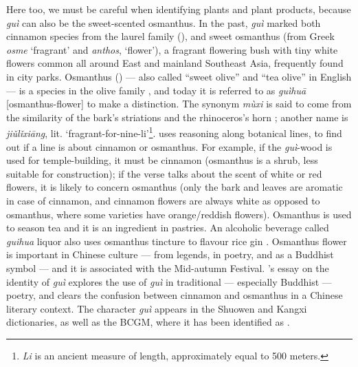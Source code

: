 Here too, we must be careful when identifying plants and plant products, because \textit{guì} can also be the sweet-scented osmanthus. In the past, \textit{guì} marked both cinnamon species from the laurel family (), and sweet osmanthus (from Greek \textit{osme} `fragrant' and \textit{anthos}, `flower'), a fragrant flowering bush with tiny white flowers common all around East and mainland Southeast Asia, frequently found in city parks. Osmanthus () --- also called ``sweet olive'' and ``tea olive'' in English --- is a species in the olive family  \parencite[191]{pearlstine_scent_2022}, and today it is referred to as  \textit{guìhuā} [osmanthus-flower] to make a distinction. The synonym  \textit{mùxi} is said to come from the similarity of the bark's striations and the rhinoceros's horn \parencite{chennault_reclusive_2006}; another name is  \textit{jiǔlǐxiāng}, lit. `fragrant-for-nine-li'\footnote{\textit{Li} is an ancient measure of length, approximately equal to 500 meters.}. \textcite{chennault_reclusive_2006} uses reasoning along botanical lines, to find out if a line is about cinnamon or osmanthus. For example, if the \textit{guì}-wood is used for temple-building, it must be cinnamon (osmanthus is a shrub, less suitable for construction); if the verse talks about the scent of white or red flowers, it is likely to concern osmanthus (only the bark and leaves are aromatic in case of cinnamon, and cinnamon flowers are always white as opposed to osmanthus, where some varieties have orange/reddish flowers). Osmanthus is used to season tea and it is an ingredient in pastries. An alcoholic beverage called \textit{guihua} liquor also uses osmanthus tincture to flavour rice gin \parencite[627]{hu_food_2005}. Osmanthus flower is important in Chinese culture --- from legends, in poetry, and as a Buddhist symbol --- and it is associated with the Mid-autumn Festival. \textcite{chennault_reclusive_2006}'s essay on the identity of \textit{guì} explores the use of \textit{guì} in traditional --- especially Buddhist --- poetry, and clears the confusion between cinnamon and osmanthus in a Chinese literary context. The character  \textit{guì} appears in the \gls{Shuowen} and \gls{Kangxi} dictionaries, as well as the \gls{BCGM}, where it has been identified as  \parencite[732]{zhang_dictionary_2015}.


